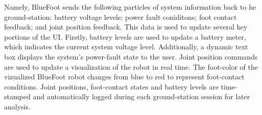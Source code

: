 	Namely, BlueFoot sends the following particles of system information back to he ground-station: battery voltage levels; power fault coniditons; foot contact feedback; and joint position feedback. This data is used to update several key portions of the UI. Firstly, battery levels are used to update a battery meter, which indicates the current system voltage level. Additionally, a dynamic text box displays the system's power-fault state to the user. Joint position commands are used to update a visualization of the robot in real time. The foot-color of the vizualized BlueFoot robot changes from blue to red to represent foot-contact conditions. Joint positions, foot-contact states and battery levels are time-stamped and automatically logged during each ground-station session for later analysis. 

